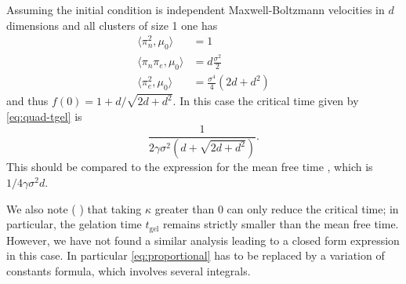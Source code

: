 Assuming the initial condition is independent Maxwell-Boltzmann velocities in $d$ dimensions and all clusters of size 1 one has
\begin{align*}
    \langle \pi_n^2, \mu_0\rangle &= 1\\
    \langle \pi_n \pi_e, \mu_0\rangle &= d\frac{\sigma^2}{2}\\
    \langle \pi_e^2, \mu_0\rangle &= \frac{\sigma^4}{4}\left(2d + d^2\right)
\end{align*}
and thus $f(0) = 1 + d / \sqrt{2d + d^2}$.
In this case the critical time given by \eqref{eq:quad-tgel} is
\begin{equation}
    \frac{1}{2\gamma \sigma^2 \left(d + \sqrt{2d +d^2}\right)}.
\end{equation}
This should be compared to the expression for the mean free time \cite[equation 4.38]{PSW17}, which is $1/4\gamma \sigma^2 d$.

We also note ( ) that taking $\kappa$ greater than $0$ can only reduce the critical time; in particular, the gelation time $t_\text{gel}$ remains strictly smaller than the mean free time. However, we have not found a similar analysis leading to a closed form expression in this case.  
In particular \eqref{eq:proportional} has to be replaced by a variation of constants formula, which involves several integrals.